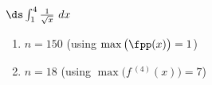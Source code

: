 {$\ds \int_{1}^{4} \frac{1}{\sqrt x} \ dx$}
{\begin{enumerate}
\item		$n=150$ (using $\max\big(\fpp(x)\big)=1$)
\item		$n=18$	(using $\max\big(f\,^{(4)}(x)\big)=7$)
\end{enumerate}
}